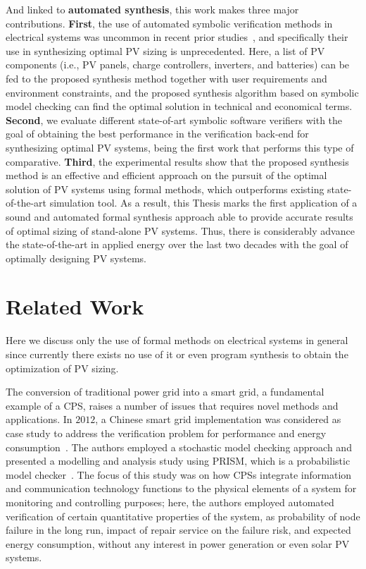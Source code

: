 And linked to \textbf{automated synthesis}, this work makes three major contributions. 
\textbf{First}, the use of automated symbolic verification methods in electrical systems was uncommon in recent prior studies~\cite{abs-1811-09438}, and specifically their use in synthesizing optimal PV sizing is unprecedented. Here, a list of PV components (i.e., PV panels, charge controllers, inverters, and batteries) can be fed to the proposed synthesis method together with user requirements and environment constraints, and the proposed synthesis algorithm based on symbolic model checking can find the optimal solution in technical and economical terms. 
\textbf{Second}, we evaluate different state-of-art symbolic software verifiers with the goal of obtaining the best performance in the verification back-end for synthesizing optimal PV systems, being the first work that performs this type of comparative. 
\textbf{Third}, the experimental results show that the proposed synthesis method is an effective and efficient approach on the pursuit of the optimal solution of PV systems using formal methods, which outperforms existing state-of-the-art simulation tool. As a result, this Thesis marks the first application of a sound and automated formal synthesis approach able to provide accurate results of optimal sizing of stand-alone PV systems. Thus, there is considerably advance the state-of-the-art in applied energy over the last two decades with the goal of optimally designing PV systems.
 
\section{Related Work}

Here we discuss only the use of formal methods on electrical systems in general since currently there exists no use of it or even program synthesis to obtain the optimization of PV sizing.

The conversion of traditional power grid into a smart grid, a fundamental example of a CPS, 
raises a number of issues that requires novel methods and applications. In $2012$, a Chinese smart grid implementation was considered as case study to address the verification problem for performance and energy consumption~\cite{Yukseletall2012}. The authors employed a stochastic model checking approach and presented a modelling and analysis study using PRISM, which is a probabilistic model checker~\cite{KwiatkowskaNP11}. The focus of this study was on how CPSs integrate information and communication technology functions to the physical elements of a system for monitoring and controlling purposes; here, the authors employed automated verification of certain quantitative properties of the system, as probability of	 node failure in the long run, impact of repair service on the failure risk, and expected energy consumption, without any interest in power generation or even solar PV systems.

